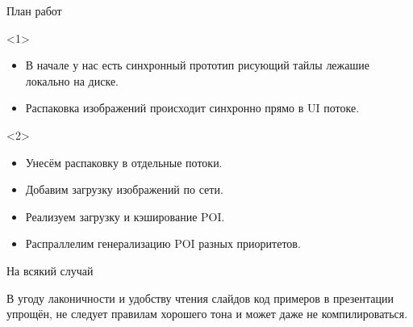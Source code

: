 \documentclass[aspectratio=169,hyperref={unicode},17pt]{beamer}
\begin{document}
\begin{frame}[t]{План работ}
\begin{onlyenv}<1>
\begin{itemize}
 \item В начале у нас есть синхронный прототип рисующий тайлы лежашие локально на диске.
 \item Распаковка изображений происходит синхронно прямо в UI потоке.
\end{itemize}
\end{onlyenv}
\begin{onlyenv}<2>
\begin{itemize}
 \item Унесём распаковку в отдельные потоки.
 \item Добавим загрузку изображений по сети.
 \item Реализуем загрузку и кэширование POI.
 \item Распраллелим генерализацию POI разных приоритетов.
\end{itemize}
\end{onlyenv}
\end{frame}

\begin{frame}[t]{На всякий случай}

В угоду лаконичности и удобству чтения слайдов код примеров в презентации упрощён, не следует правилам хорошего тона и
может даже не компилироваться.
\end{frame}
\end{document}

